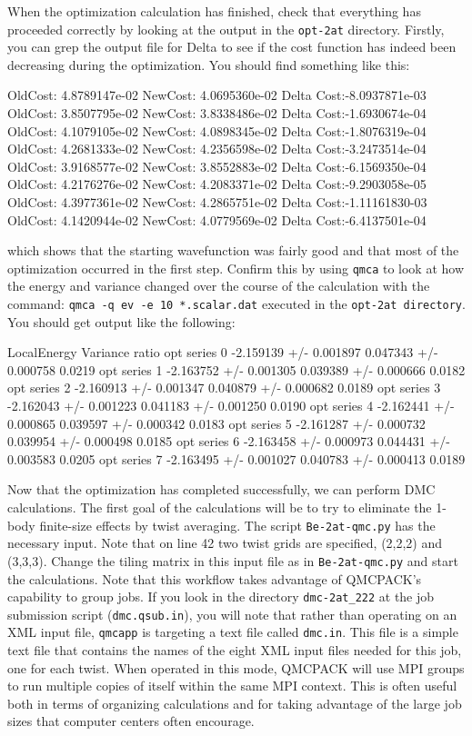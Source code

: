 When the optimization calculation has finished, check that everything has proceeded correctly by looking at the output in the \texttt{opt-2at} directory.  Firstly, you can grep the output file for Delta to see if the cost function has indeed been decreasing during the optimization.  You should find something like this:
\begin{shade}
 OldCost: 4.8789147e-02 NewCost: 4.0695360e-02 Delta Cost:-8.0937871e-03
 OldCost: 3.8507795e-02 NewCost: 3.8338486e-02 Delta Cost:-1.6930674e-04
 OldCost: 4.1079105e-02 NewCost: 4.0898345e-02 Delta Cost:-1.8076319e-04
 OldCost: 4.2681333e-02 NewCost: 4.2356598e-02 Delta Cost:-3.2473514e-04
 OldCost: 3.9168577e-02 NewCost: 3.8552883e-02 Delta Cost:-6.1569350e-04
 OldCost: 4.2176276e-02 NewCost: 4.2083371e-02 Delta Cost:-9.2903058e-05
 OldCost: 4.3977361e-02 NewCost: 4.2865751e-02 Delta Cost:-1.11161830-03
 OldCost: 4.1420944e-02 NewCost: 4.0779569e-02 Delta Cost:-6.4137501e-04
\end{shade}
which shows that the starting wavefunction was fairly good and that most of the optimization occurred in the first step.  Confirm this by using \texttt{qmca} to look at how the energy and variance changed over the course of the calculation with the command: \texttt{qmca -q ev -e 10 *.scalar.dat} executed in the \texttt{opt-2at directory}.  You should get output like the following:
\begin{shade}
                 LocalEnergy               Variance             ratio
opt  series 0  -2.159139 +/- 0.001897   0.047343 +/- 0.000758   0.0219 
opt  series 1  -2.163752 +/- 0.001305   0.039389 +/- 0.000666   0.0182 
opt  series 2  -2.160913 +/- 0.001347   0.040879 +/- 0.000682   0.0189 
opt  series 3  -2.162043 +/- 0.001223   0.041183 +/- 0.001250   0.0190 
opt  series 4  -2.162441 +/- 0.000865   0.039597 +/- 0.000342   0.0183 
opt  series 5  -2.161287 +/- 0.000732   0.039954 +/- 0.000498   0.0185 
opt  series 6  -2.163458 +/- 0.000973   0.044431 +/- 0.003583   0.0205 
opt  series 7  -2.163495 +/- 0.001027   0.040783 +/- 0.000413   0.0189 
\end{shade}

Now that the optimization has completed successfully, we can perform DMC calculations.  The first goal of the calculations will be to try to eliminate the 1-body finite-size effects by twist averaging.  The script \texttt{Be-2at-qmc.py} has the necessary input.  Note that on line 42 two twist grids are specified, (2,2,2) and (3,3,3).  Change the tiling matrix in this input file as in \texttt{Be-2at-qmc.py} and start the calculations.  Note that this workflow takes advantage of QMCPACK's capability to group jobs.  If you look in the directory \texttt{dmc-2at\_222} at the job submission script (\texttt{dmc.qsub.in}), you will note that rather than operating on an XML input file, \texttt{qmcapp} is targeting a text file called \texttt{dmc.in}.  This file is a simple text file that contains the names of the eight XML input files needed for this job, one for each twist.  When operated in this mode, QMCPACK will use MPI groups to run multiple copies of itself within the same MPI context.  This is often useful both in terms of organizing calculations and for taking advantage of the large job sizes that computer centers often encourage.

